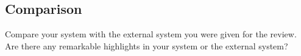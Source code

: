 \subsection{Comparison}

Compare your system with the external system you were given for the
review.   Are there any remarkable highlights in your system or the external system?